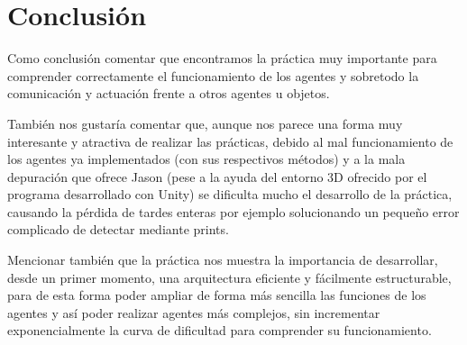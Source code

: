\documentclass[11pt,oneside,a4paper]{article}
\begin{document}
\section{Conclusión}
Como conclusión comentar que encontramos la práctica muy importante para comprender correctamente el funcionamiento de los agentes y sobretodo la comunicación y actuación frente a otros agentes u objetos.

También nos gustaría comentar que, aunque nos parece una forma muy interesante y atractiva de realizar las prácticas, debido al mal funcionamiento de los agentes ya implementados (con sus respectivos métodos) y a la mala depuración que ofrece Jason (pese a la ayuda del entorno 3D ofrecido por el programa desarrollado con Unity) se dificulta mucho el desarrollo de la práctica, causando la pérdida de tardes enteras por ejemplo solucionando un pequeño error complicado de detectar mediante prints.

Mencionar también que la práctica nos muestra la importancia de desarrollar, desde un primer momento, una arquitectura eficiente y fácilmente estructurable, para de esta forma poder ampliar de forma más sencilla las funciones de los agentes y así poder realizar agentes más complejos, sin incrementar exponencialmente la curva  de dificultad para comprender su funcionamiento.
\end{document}
